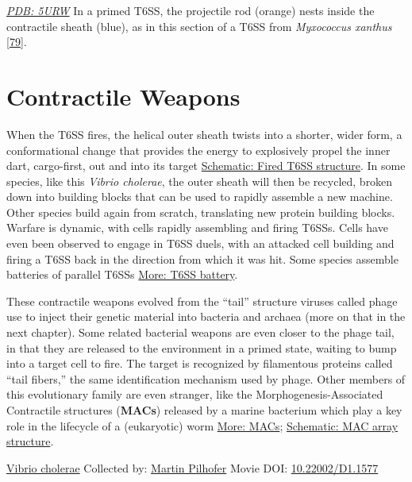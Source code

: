 \documentclass[]{tufte-book}
\begin{document}
\href{http://rcsb.org/structure/5URW}{\emph{PDB: 5URW}}
In a primed T6SS, the projectile rod (orange) nests inside the contractile sheath (blue), as in this section of a T6SS from \emph{Myxococcus xanthus} {[}\protect\hyperlink{ref-chang2017}{79}{]}.

\hypertarget{contractile-weapons}{%
\section{Contractile Weapons}\label{contractile-weapons}}

When the T6SS fires, the helical outer sheath twists into a shorter, wider form, a conformational change that provides the energy to explosively propel the inner dart, cargo-first, out and into its target \protect\hyperlink{Fired_T6SS_structure}{Schematic: Fired T6SS structure}. In some species, like this \emph{Vibrio cholerae}, the outer sheath will then be recycled, broken down into building blocks that can be used to rapidly assemble a new machine. Other species build again from scratch, translating new protein building blocks. Warfare is dynamic, with cells rapidly assembling and firing T6SSs. Cells have even been observed to engage in T6SS duels, with an attacked cell building and firing a T6SS back in the direction from which it was hit. Some species assemble batteries of parallel T6SSs \protect\hyperlink{T6SS_battery}{More: T6SS battery}.

These contractile weapons evolved from the ``tail'' structure viruses called phage use to inject their genetic material into bacteria and archaea (more on that in the next chapter). Some related bacterial weapons are even closer to the phage tail, in that they are released to the environment in a primed state, waiting to bump into a target cell to fire. The target is recognized by filamentous proteins called ``tail fibers,'' the same identification mechanism used by phage. Other members of this evolutionary family are even stranger, like the Morphogenesis-Associated Contractile structures (\textbf{MACs}) released by a marine bacterium which play a key role in the lifecycle of a (eukaryotic) worm \protect\hyperlink{MACs}{More: MACs}; \protect\hyperlink{MAC_array_structure}{Schematic: MAC array structure}.



\hypertarget{htmlwidget-90fe3d5877ae4737f68f}{}

\label{fig:9-7}\protect\hyperlink{tree}{Vibrio cholerae} Collected by: \protect\hyperlink{martin_pilhofer}{Martin Pilhofer} Movie DOI: \href{https://doi.org/10.22002/D1.1577}{10.22002/D1.1577}
\end{document}
